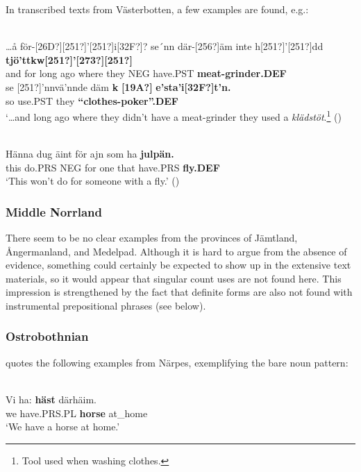 \z

In transcribed texts from Västerbotten, a few examples are found, e.g.:

\ea \label{} 
\\
\gll …å  för-[26D?][251?]’[251?]i[32F?]?  se´nn  där-[256?]äm  inte  h[251?]’[251?]dd  \textbf{tjö’ttkw[251?]’[273?][251?]}\\
and  for long  ago  where they  NEG  have.PST  \textbf{meat-grinder.DEF}\\
\gll se  [251?]’nnvä’nnde  däm  \textbf{k} \textbf{[19A?]} \textbf{e’sta’i[32F?]t’n.}\\
so  use.PST  they  \textbf{“clothes-poker”.DEF}\\
\glt ‘…and long ago where they didn’t have a meat-grinder they used a \textit{klädstöt}.\footnote{ Tool used when washing clothes.} (\citet[303]{Westerberg2004})

\z

\ea \label{} 
\\
\gll Hänna  dug  äint  för  ajn  som  ha  \textbf{julpän.} \\
this  do.PRS  NEG  for  one  that  have.PRS  \textbf{fly.DEF} \\
\glt ‘This won’t do for someone with a fly.’ (\citet[94]{Westerlund1978})

\z

\subsubsection{Middle Norrland}
 There seem to be no clear examples from the provinces of Jämtland, Ångermanland, and Medelpad. Although it is hard to argue from the absence of evidence, something could certainly be expected to show up in the extensive text materials, so it would appear that singular count uses are not found here. This impression is strengthened by the fact that definite forms are also not found with instrumental prepositional phrases (see below). 

\subsubsection{Ostrobothnian}
 \citet[207]{Nikula1997} quotes the following examples from Närpes, exemplifying the bare noun pattern:

\ea\label{}
\\
\gll Vi  ha:  \textbf{häst} därhäim.\\
we  have.PRS.PL  \textbf{horse} at\_home\\
\glt ‘We have a horse at home.’

